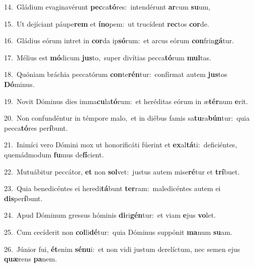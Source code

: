 {\numbfont\textcolor{\numbcolor}{14.}}~Gládium evaginavérunt \textbf{pec}\-ca\-\textbf{tó}\-res:~\star intendérunt \textbf{ar}\-cum \textbf{su}\-um,\par
{\numbfont\textcolor{\numbcolor}{15.}}~Ut dejíciant páupe\textbf{rem} et \textbf{ín}\-\textbf{o}pem:~\star ut trucídent \textbf{rec}\-tos \textbf{cor}\-de.\par
{\numbfont\textcolor{\numbcolor}{16.}}~Gládius eórum intret in \textbf{cor}\-da ip\-\textbf{só}\-rum:~\star et arcus eórum \textbf{con}\-frin\-\textbf{gá}\-tur.\par
{\numbfont\textcolor{\numbcolor}{17.}}~Mélius est \textbf{mó}\-dicum \textbf{jus}\-to,~\star super divítias pecca\-\textbf{tó}\-rum \textbf{mul}\-tas.\par
{\numbfont\textcolor{\numbcolor}{18.}}~Quóniam bráchia peccatórum \textbf{con}\-te\-\textbf{rén}\-tur:~\star confírmat autem \textbf{jus}\-tos \textbf{Dó}\-minus.\par
{\numbfont\textcolor{\numbcolor}{19.}}~Novit Dóminus dies imma\-\textbf{cu}\-la\-\textbf{tó}\-rum:~\star et heréditas eórum in æ\-\textbf{tér}\-num \textbf{e}\-rit.\par
{\numbfont\textcolor{\numbcolor}{20.}}~Non confundéntur in témpore malo,~\dagger et in diébus famis sa\-\textbf{tu}\-ra\-\textbf{bún}\-tur:~\star quia pecca\-\textbf{tó}\-res per\-\textbf{í}\-bunt.\par
{\numbfont\textcolor{\numbcolor}{21.}}~Inimíci vero Dómini mox ut honorificáti fúerint et \textbf{ex}\-al\-\textbf{tá}\-ti:~\star deficiéntes, quemádmodum \textbf{fu}\-mus de\-\textbf{fí}\-cient.\par
{\numbfont\textcolor{\numbcolor}{22.}}~Mutuábitur peccátor, \textbf{et} non \textbf{sol}\-vet:~\star justus autem mise\-\textbf{ré}\-tur et \textbf{trí}\-buet.\par
{\numbfont\textcolor{\numbcolor}{23.}}~Quia benedicéntes ei heredi\-\textbf{tá}\-bunt \textbf{ter}\-ram:~\star maledicéntes autem ei \textbf{dis}\-per\-\textbf{í}\-bunt.\par
{\numbfont\textcolor{\numbcolor}{24.}}~Apud Dóminum gressus hóminis \textbf{di}\-ri\-\textbf{gén}\-tur:~\star et viam \textbf{e}\-jus \textbf{vo}\-let.\par
{\numbfont\textcolor{\numbcolor}{25.}}~Cum cecíderit non \textbf{col}\-li\-\textbf{dé}\-tur:~\star quia Dóminus suppónit \textbf{ma}\-num \textbf{su}\-am.\par
{\numbfont\textcolor{\numbcolor}{26.}}~Júnior fui, \textbf{ét}\-enim \textbf{sé}\-\textbf{nu}i:~\star et non vidi justum derelíctum, nec semen ejus \textbf{quæ}\-rens \textbf{pa}\-nem.\par
